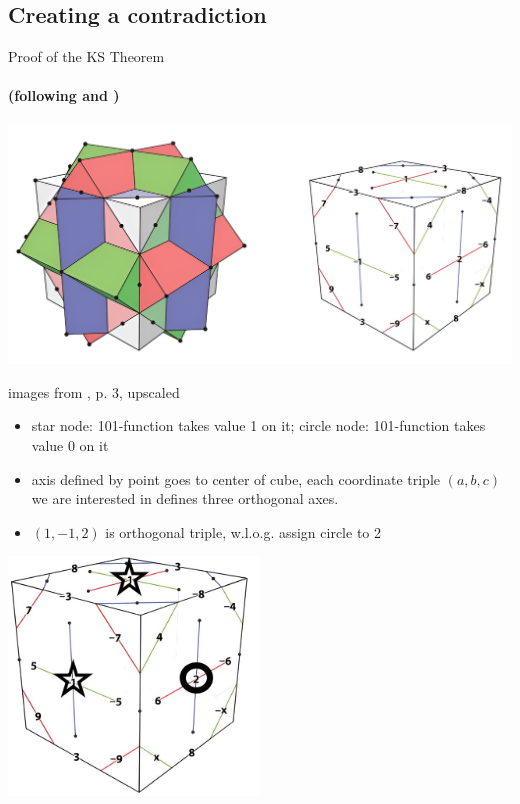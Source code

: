 \documentclass{beamer}
\begin{document}
\subsection{Creating a contradiction}

\begin{frame}{Proof of the KS Theorem}
\framesubtitle{(following \cite{conway2008strong} and \cite{Peres_1991})}
\includegraphics[width=\textwidth]{KSProof00.jpg}
\begin{tiny}
\begin{flushright}images from \cite{conway2008strong}, p. 3, upscaled\end{flushright}\end{tiny}
\end{frame}

\begin{frame}
\begin{itemize}
\item star node: 101-function takes value 1 on it; circle node: 101-function takes value 0 on it
\item axis defined by point goes to center of cube, each coordinate triple $(a,b,c)$ we are interested in defines three orthogonal axes. 
\item $(1,-1,2)$ is orthogonal triple, w.l.o.g. assign circle to 2
\end{itemize}
\begin{center}
\includegraphics[width=0.5\textwidth]{KSProof01.jpg}
\end{center}
\end{frame}
\end{document}
